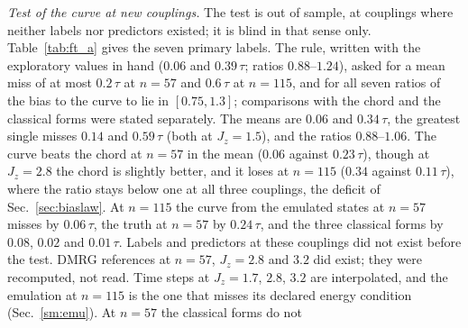 \documentclass[aps,prx,onecolumn,10pt,nofootinbib,longbibliography,floatfix]{revtex4-2}
\theoremstyle{remark}
\newcommand{\Jz}{J_z}
\begin{document}
\emph{Test of the curve at new couplings.} The test is out of sample, at couplings where neither labels nor predictors
existed; it is blind in that sense only. Table~\ref{tab:ft_a} gives the seven primary labels. The rule, written with
the exploratory values in hand ($0.06$ and $0.39\,\tau$; ratios $0.88$--$1.24$), asked for a mean miss of at %
most $0.2\,\tau$ at $n=57$ and $0.6\,\tau$ at $n=115$, and for all seven ratios of the bias to the curve to lie in %
$[0.75,1.3]$; comparisons with the chord and the classical forms were stated separately. The means are $0.06$ and %
$0.34\,\tau$, the greatest single misses $0.14$ and $0.59\,\tau$ (both at $\Jz=1.5$), and the ratios %
$0.88$--$1.06$. The curve beats the chord at $n=57$ in the mean ($0.06$ against $0.23\,\tau$), %
though at $\Jz=2.8$ the chord is slightly better, and it loses at $n=115$ ($0.34$ against $0.11\,\tau$), where the ratio %
stays below one at all three couplings, the deficit of Sec.~\ref{sec:biaslaw}. At $n=115$ the curve from the emulated
states at $n=57$ misses by $0.06\,\tau$, the truth at $n=57$ by $0.24\,\tau$, and the three classical forms by $0.08$, %
$0.02$ and $0.01\,\tau$. Labels and predictors at these couplings did not exist before the test. DMRG references at %
$n=57$, $\Jz=2.8$ and $3.2$ did exist; they were recomputed, not read. Time steps at $\Jz=1.7$, $2.8$, $3.2$ are %
interpolated, and the emulation at $n=115$ is the one that misses its declared energy condition (Sec.~\ref{sm:emu}). At $n=57$ the classical forms do not
\end{document}
